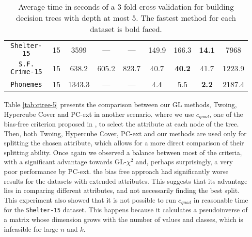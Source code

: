 \begin{table*}[]
\begin{tabular}{c|c|c|c|c|c|c|c|c}
{\tt Shelter-15}    & 15 & 3599       & ---        & ---         & 149.9     & 166.3      & {\bf 14.1 }& 7968       \\   
{\tt S.F. Crime-15} & 15 & 638.2      & 605.2      & 823.7       & 40.7      & {\bf 40.2} & 41.7       & 1223.9     \\ 
{\tt Phonemes}      & 15 & 1343.3     & ---        & ---         & 4.4       & 5.5        & {\bf 2.2 } & 2187.4
\end{tabular}
\caption{Average time in seconds of a 3-fold cross validation for building decision trees with depth at most 5. The fastest method for each dataset is bold faced.}
\label{tab:time-5}
\end{table*}



Table \ref{tab:ctree-5} presents the 
comparison between our GL methods, Twoing, Hypercube Cover and PC-ext in another scenario,
where we use $c_{quad}$, one of the bias-free criterion proposed in \cite{Hothorn:2006:URP}, to select the attribute at each node of the tree. 
Then, both Twoing, Hypercube Cover, PC-ext and our methods are  used only for splitting the chosen attribute, which allows for a  more direct comparison of their splitting ability. Once again we observed a balance between most of the criteria, with a significant advantage towards GL-$\chi^2$ and, perhaps surprisingly, a very poor performance by PC-ext. the bias free approach had significantly worse results for the datasets with extended attributes. This suggests that its advantage lies in comparing different attributes, and not necessarily finding the best split. This experiment also showed that it is not possible to run $c_{quad}$ in reasonable time for the {\tt Shelter-15} dataset. This happens because it calculates a pseudoinverse of a matrix whose dimension grows with the number of values and classes, which is infeasible for large $n$ and $k$.


